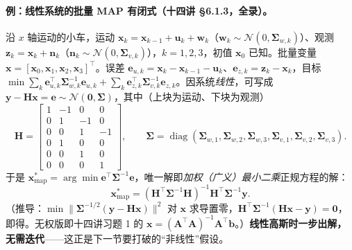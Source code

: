 \paragraph{例：线性系统的批量 MAP 有闭式（十四讲 §6.1.3，全录）。}\cite{gaoxiang2019slam14}
沿 $x$ 轴运动的小车，运动 $\mathbf{x}_k=\mathbf{x}_{k-1}+\mathbf{u}_k+\mathbf{w}_k$（$\mathbf{w}_k\sim\mathcal{N}(0,\boldsymbol{\Sigma}_{w,k})$）、观测 $\mathbf{z}_k=\mathbf{x}_k+\mathbf{n}_k$（$\mathbf{n}_k\sim\mathcal{N}(0,\boldsymbol{\Sigma}_{v,k})$），$k=1,2,3$，初值 $\mathbf{x}_0$ 已知。批量变量 $\mathbf{x}=[\mathbf{x}_0,\mathbf{x}_1,\mathbf{x}_2,\mathbf{x}_3]^\top$。误差 $\mathbf{e}_{u,k}=\mathbf{x}_k-\mathbf{x}_{k-1}-\mathbf{u}_k$、$\mathbf{e}_{z,k}=\mathbf{z}_k-\mathbf{x}_k$，目标 $\min\sum_k\mathbf{e}_{u,k}^\top\boldsymbol{\Sigma}_{w,k}^{-1}\mathbf{e}_{u,k}+\sum_k\mathbf{e}_{z,k}^\top\boldsymbol{\Sigma}_{v,k}^{-1}\mathbf{e}_{z,k}$。因系统\emph{线性}，可写成 $\mathbf{y}-\mathbf{H}\mathbf{x}=\mathbf{e}\sim\mathcal{N}(\mathbf{0},\boldsymbol{\Sigma})$，其中（上块为运动、下块为观测）
\begin{equation}
  \mathbf{H}=\begin{bmatrix}
  1&-1&0&0\\ 0&1&-1&0\\ 0&0&1&-1\\
  0&1&0&0\\ 0&0&1&0\\ 0&0&0&1
  \end{bmatrix},\qquad
  \boldsymbol{\Sigma}=\operatorname{diag}(\boldsymbol{\Sigma}_{w,1},\boldsymbol{\Sigma}_{w,2},\boldsymbol{\Sigma}_{w,3},\boldsymbol{\Sigma}_{v,1},\boldsymbol{\Sigma}_{v,2},\boldsymbol{\Sigma}_{v,3}).
  \label{eq:nlopt-linear-H}
\end{equation}
于是 $\mathbf{x}^*_{\text{map}}=\arg\min\mathbf{e}^\top\boldsymbol{\Sigma}^{-1}\mathbf{e}$，唯一解即\emph{加权（广义）最小二乘}正规方程的解：
\begin{equation}
  \mathbf{x}^*_{\text{map}}=(\mathbf{H}^\top\boldsymbol{\Sigma}^{-1}\mathbf{H})^{-1}\mathbf{H}^\top\boldsymbol{\Sigma}^{-1}\mathbf{y}.
  \label{eq:nlopt-gls}
\end{equation}
（推导：$\min\|\boldsymbol{\Sigma}^{-1/2}(\mathbf{y}-\mathbf{H}\mathbf{x})\|^2$ 对 $\mathbf{x}$ 求导置零，$\mathbf{H}^\top\boldsymbol{\Sigma}^{-1}(\mathbf{H}\mathbf{x}-\mathbf{y})=\mathbf{0}$，即得。无权版即十四讲习题 1 的 $\mathbf{x}=(\mathbf{A}^\top\mathbf{A})^{-1}\mathbf{A}^\top\mathbf{b}$。）\textbf{线性高斯时一步出解，无需迭代}——这正是下一节要打破的“非线性”假设。

